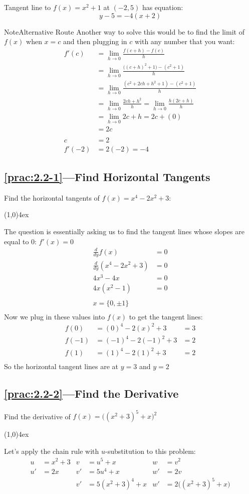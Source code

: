 \documentclass{MathNotes}
\newenvironment{note}[1]
{\begin{YellowBox}{Note}{#1}}{\end{YellowBox}}
\newcommand{\br}{
\begin{center}
\line(1,0){4ex}
\end{center}}
\begin{document}
Tangent line to $f(x)=x^2+1$ at $(-2, 5)$ has equation: $$y-5=-4(x+2)$$

\begin{note}{Alternative Route}
    Another way to solve this would be to find the limit of $f(x)$ when $x=c$ 
    and then plugging in $c$ with any number that you want:
    \begin{align*}
        f'(c)&=\lim_{h\to 0}\frac{f(c+h)-f(c)}{h} \\
        &=\lim_{h\to 0}\frac{\bigl((c+h)^2+1\bigr)-(c^2+1)}{h} \\
        &=\lim_{h\to 0}\frac{(c^2+2ch+h^2+1)-(c^2+1)}{h} \\
        &=\lim_{h\to 0}\frac{2ch+h^2}{h} = \lim_{h\to 0}\frac{h(2c+h)}{h}\\
        &=\lim_{h\to 0} 2c+h=2c+(0)\\
        &=2c\\
        \\
        c&=2\\
        f'(-2)&=2(-2)=-4
    \end{align*}
\end{note}

\subsection*{\ref{prac:2.2-1}---Find Horizontal Tangents}\label{ans:2.2-1}
Find the horizontal tangents of $f(x)=x^4-2x^2+3$:
\br
The question is essentially asking us to find the tangent lines whose
slopes are equal to 0: $f'(x)=0$
\begin{align*}
    \frac{d}{dy}f(x)&=0\\
    \frac{d}{dy}(x^4-2x^2+3)&=0\\
    4x^3-4x &=0\\
    4x(x^2-1)&=0\\
    \\
    x=\{0, \pm 1\}\\
\end{align*}
Now we plug in these values into $f(x)$ to get the tangent lines:
\begin{align*}
    f(0)&=(0)^4-2(x)^2+3&=3\\
    f(-1)&=(-1)^4-2(-1)^2+3&=2\\
    f(1)&=(1)^4-2(1)^2+3&=2\\
\end{align*}
So the horizontal tangent lines are at $y=3$ and $y=2$

\newpage
\subsection*{\ref{prac:2.2-2}---Find the Derivative}
Find the derivative of $\displaystyle f(x)=\big((x^2+3)^5+x\big)^2$
\br
Let's apply the chain rule with $u$-substitution to this problem:
\begin{align*}
    u&=x^2+3 & v&=u^5+x & w&=v^2\\
    u'&=2x & v'&=5u^4+x & w'&=2v\\
    && v'&=5(x^2+3)^4+x & w'&=2\big((x^2+3)^5+x)\\
\end{align*}
\end{document}
